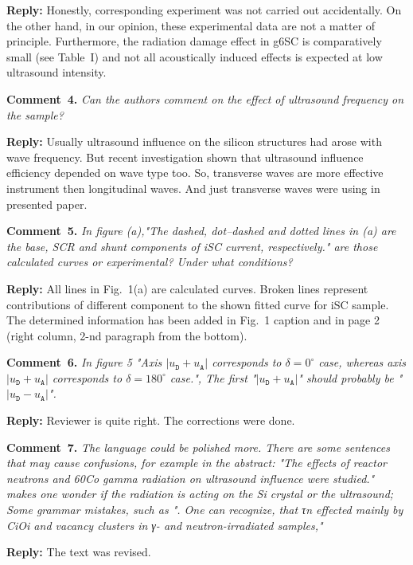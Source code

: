 \documentclass[aip,jap,preprint]{revtex4-1}
\begin{document}
\noindent
\textcolor[rgb]{0.51,0.00,0.00}{\textbf{Reply:}}
Honestly, corresponding experiment was not carried out accidentally. 
On the other hand, in our opinion, these experimental data are not a matter of principle.
Furthermore, the radiation damage effect in g6SC is comparatively small (see Table~I) and 
not all acoustically induced effects is expected at low ultrasound intensity.

\vspace{1cm}
\noindent
\textcolor[rgb]{0.00,0.50,1.00}{\textbf{Comment~4.}}
\emph{Can the authors comment on the effect of ultrasound frequency on the sample?}

\noindent
\textcolor[rgb]{0.51,0.00,0.00}{\textbf{Reply:}}
Usually ultrasound influence on the silicon structures had arose with wave frequency\cite{Olikh2011Sem,Olikh:Ultras2016}.
But recent investigation \cite{Olikh:inpress} shown that ultrasound influence efficiency depended on wave type too.
So, transverse waves are more effective instrument then longitudinal waves.
And just transverse waves were using in presented paper.


\vspace{1cm}
\noindent
\textcolor[rgb]{0.00,0.50,1.00}{\textbf{Comment~5.}}
\emph{In figure (a),"The dashed, dot--dashed and dotted lines in (a) are the base, SCR and shunt components of iSC current, respectively." are those calculated curves or experimental? Under what conditions?}

\noindent
\textcolor[rgb]{0.51,0.00,0.00}{\textbf{Reply:}}
All lines in Fig.~1(a) are calculated curves.
Broken lines represent contributions of different component to the shown fitted curve for iSC sample.
The determined information has been added in Fig.~1 caption and in page 2 (right column, 2-nd paragraph from the bottom).



\vspace{1cm}
\noindent
\textcolor[rgb]{0.00,0.50,1.00}{\textbf{Comment~6.}}
\emph{In figure 5 "Axis $|u_\mathtt{D}+u_\mathtt{A}|$ corresponds to $\delta=0^\circ$ case, whereas axis $|u_\mathtt{D}+u_\mathtt{A}|$ corresponds to $\delta=180^\circ$ case.", The first "$|u_\mathtt{D}+u_\mathtt{A}|$" should probably be "$|u_\mathtt{D}-u_\mathtt{A}|$".}

\noindent
\textcolor[rgb]{0.51,0.00,0.00}{\textbf{Reply:}}
Reviewer is quite right.
The corrections were done.

\vspace{1cm}
\noindent
\textcolor[rgb]{0.00,0.50,1.00}{\textbf{Comment~7.}}
\emph{ The language could be polished more. There are some sentences that may cause confusions, for example in the abstract:
"The effects of reactor neutrons and 60Co gamma radiation on ultrasound influence were studied." makes one wonder if the radiation is acting on the Si crystal or the ultrasound;
Some grammar mistakes, such as
". One can recognize, that τn effected mainly by CiOi and vacancy clusters in γ- and neutron-irradiated samples,"}

\noindent
\textcolor[rgb]{0.51,0.00,0.00}{\textbf{Reply:}}
The text was revised.







\end{document}
